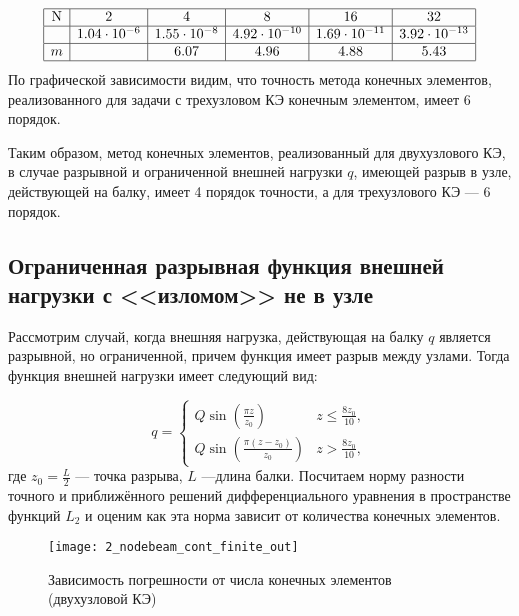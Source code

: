 \documentclass[12pt,a4paper]{article}
\begin{document}
\[
\begin{array}{|c|c|c|c|c|c|}
\hline
\text{N} & 2 & 4 & 8 & 16 & 32 \\ \hline
\Delta  & 1.04 \cdot 10^{-6} & 1.55 \cdot 10^{-8} & 4.92 \cdot 10^{-10} & 1.69 \cdot 10^{-11} & 3.92 \cdot 10^{-13} \\ \hline
m  &  & 6.07 & 4.96 & 4.88 & 5.43 \\ 
\hline
\end{array}
\]
По графической зависимости видим, что точность метода конечных элементов, реализованного для задачи с трехузловом КЭ конечным элементом, имеет 6 порядок. 

Таким образом, метод конечных элементов, реализованный для двухузлового КЭ, в случае разрывной и ограниченной внешней нагрузки $q$, имеющей разрыв в узле, действующей на балку, имеет 4 порядок точности, а для трехузлового КЭ --- 6 порядок. 




\subsection[Ограниченная функция внешней нагрузки с <<изломом>> не в узле]{Ограниченная разрывная функция внешней нагрузки с <<изломом>> не в узле}

Рассмотрим случай, когда внешняя нагрузка, действующая на балку $q$ является разрывной, но ограниченной, причем функция имеет разрыв между узлами. 
Тогда функция внешней нагрузки имеет следующий вид:

\begin{equation}
q = 
 \begin{cases}
	Q \sin \left(\frac{\pi  z}{z_{0}}\right) & z \leq \frac{8 z_{0}}{10}, \\
    Q \sin \left(\frac{\pi  (z-z_{0})}{z_{0}}\right) & z > \frac{8 z_{0}}{10},
 \end{cases}
\end{equation}
где $z_{0}=\frac{L}{2}$ --- точка разрыва, $L$ ---длина балки. 
Посчитаем норму разности точного и приближённого решений дифференциального уравнения в пространстве функций $L_{2}$  и оценим как эта норма зависит от количества конечных элементов.\\

\begin{figure}[H]
		\centering
		\texttt{[image: 2\_nodebeam\_cont\_finite\_out]}
		\caption{Зависимость погрешности от числа конечных элементов (двухузловой КЭ)}
		\label{fig:2_nodebeam_cont_finite_out}
	\end{figure}
\end{document}
